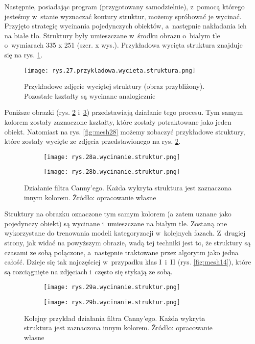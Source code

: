 Następnie, posiadając program (przygotowany samodzielnie), z~pomocą którego jesteśmy w~stanie wyznaczać kontury struktur, możemy spróbować je wycinać. Przyjęto strategię wycinania pojedynczych obiektów, a~następnie nakładania ich na białe tło. Struktury były umieszczane w~środku obrazu o~białym tle o~wymiarach 335 x 251 (szer. x wys.). Przykładowa wycięta struktura znajduje się na rys. \ref{fig:mesh26.pojedyncza}.
\begin{figure}[h]
    \centering
    \texttt{[image: rys.27.przykladowa.wycieta.struktura.png]}
    \caption{Przykładowe zdjęcie wyciętej struktury (obraz przybliżony). Pozostałe kształty są wycinane analogicznie}
    \label{fig:mesh26.pojedyncza}
\end{figure}
Poniższe obrazki (rys. \ref{fig:mesh26} i~\ref{fig:mesh27}) przedstawiają działanie tego procesu. Tym samym kolorem zostały zaznaczone kształty, które zostały potraktowane jako jeden obiekt. Natomiast na rys. \ref{fig:mesh28} możemy zobaczyć przykładowe struktury, które zostały wycięte ze zdjęcia przedstawionego na rys. \ref{fig:mesh26}. 
\begin{figure}[h]
	\centering
	\begin{subfigure}{0.29\textwidth}
	    \centering
	    \texttt{[image: rys.28a.wycinanie.struktur.png]}
	\end{subfigure}
	\begin{subfigure}{0.29\textwidth}
	    \centering
	    \texttt{[image: rys.28b.wycinanie.struktur.png]}
	\end{subfigure}
	\caption{\label{fig:mesh26}Działanie filtra Canny'ego. Każda wykryta struktura jest zaznaczona innym kolorem. Źródło: opracowanie własne}
\end{figure}
Struktury na obrazku oznaczone tym samym kolorem (a zatem uznane jako pojedynczy obiekt) są wycinane i~umieszczane na białym tle. Zostaną one wykorzystane do trenowania modeli kategoryzacji w~kolejnych fazach. Z~drugiej strony, jak widać na powyższym obrazie, wadą tej techniki jest to, że struktury są czasami ze sobą połączone, a~następnie traktowane przez algorytm jako jedna całość. Dzieje się tak najczęściej w~przypadku klas I~i~II (rys. \ref{fig:mesh14}), które są rozciągnięte na zdjęciach i~często się stykają ze sobą. 
\begin{figure}[!h]
	\centering
	\begin{subfigure}{0.29\textwidth}
	    \centering
	    \texttt{[image: rys.29a.wycinanie.struktur.png]}
	\end{subfigure}
	\begin{subfigure}{0.29\textwidth}
	    \centering
	    \texttt{[image: rys.29b.wycinanie.struktur.png]}
	\end{subfigure}
	\caption{\label{fig:mesh27}Kolejny przykład działania filtra Canny'ego. Każda wykryta struktura jest zaznaczona innym kolorem. Źródło: opracowanie własne}
\end{figure}
